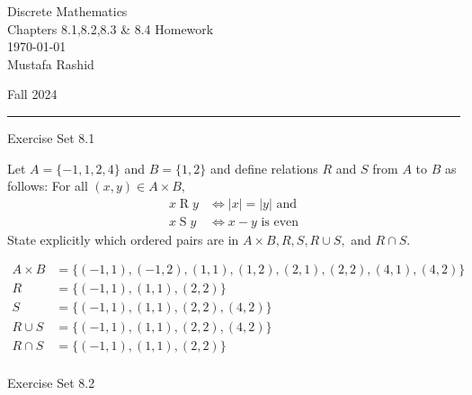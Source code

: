 \documentclass[12pt,letterpaper, onecolumn]{exam}
\begin{document}
	
	\begingroup  
	\noindent\LARGE Discrete Mathematics\\
	\noindent\LARGE Chapters 8.1,8.2,8.3 \& 8.4 Homework\\
	\noindent\large \today\\
	\noindent\large Mustafa Rashid\par
	\noindent\large Fall 2024\par
	\endgroup
	\rule{\textwidth}{0.4pt}
	\pointsdroppedatright
	\printanswers
	\renewcommand{\solutiontitle}{\noindent\textbf{Ans:}\enspace}  
	
	\centerline{Exercise Set 8.1}
	\begin{questions}
		\setcounter{question}{19}\question Let $A=\{-1,1,2,4\}$ and $B=\{1,2\}$ and define relations $R$ and $S$ from $A$ to $B$ as follows: For all $(x,y)\in A\times B,$
		\begin{align*}
			x\mathrel{R}y &\Leftrightarrow |x|=|y| \text{ and}\\
			x\mathrel{S}y&\Leftrightarrow x-y \text{ is even}
		\end{align*}
		State explicitly which ordered pairs are in $A\times B, R, S, R\cup S,$ and $R\cap S$. 
		\begin{solution}
			\begin{align*}
				A\times B&=\{(-1,1),(-1,2),(1,1),(1,2),(2,1),(2,2),(4,1),(4,2)\}\\
				R&=\{(-1,1),(1,1),(2,2)\}\\
				S&=\{(-1,1),(1,1),(2,2),(4,2)\}\\
				R\cup S&=\{(-1,1),(1,1),(2,2),(4,2)\}\\
				R\cap S&=\{(-1,1),(1,1),(2,2)\}\\
			\end{align*}
		\end{solution}
	\end{questions}
	\centerline{Exercise Set 8.2}
\end{document}
